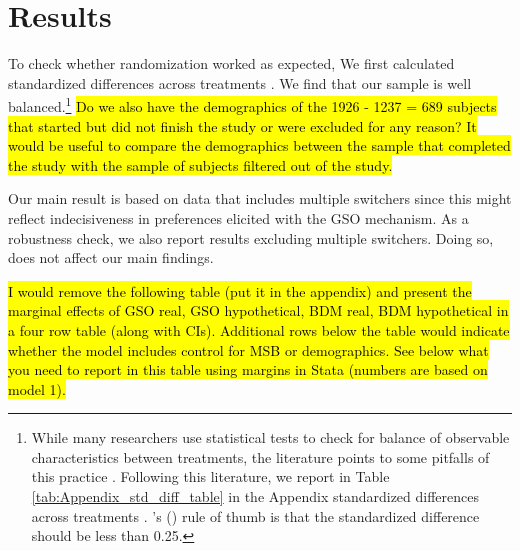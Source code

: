 \documentclass[12pt]{article}
\newcommand\citeapos[1]{\citeauthor{#1}'s (\citeyear{#1})} %
\begin{document}



\section{Results}
To check whether randomization worked as expected, We first calculated standardized differences across treatments \citep{CochranRubin1973}. We find that our sample is well balanced.\footnote{While many researchers use statistical tests to check for balance of observable characteristics between treatments, the literature points to some pitfalls of this practice \citep[e.g.,][]{canavari2019run,DeatonCartwright2016,BrizEtAl2017,HoEtAl2007,MoherEtAl2010,MutzPemantle2015}. Following this literature, we report in Table \ref{tab:Appendix_std_diff_table} in the Appendix standardized differences across treatments \citep{ImbensRubin2016,ImbensWooldridge2009}. \citeapos{CochranRubin1973} rule of thumb is that the standardized difference should be less than 0.25. }
\hl{Do we also have the demographics of the 1926 - 1237 = 689 subjects that started but did not finish the study or were excluded for any reason? It would be useful to compare the demographics between the sample that completed the study with the sample of subjects filtered out of the study. } %


Our main result is based on data that includes multiple switchers since this might reflect indecisiveness in preferences elicited with the GSO mechanism. As a robustness check, we also report results excluding multiple switchers. Doing so, does not affect our main findings.

\hl{I would remove the following table (put it in the appendix) and present the marginal effects of GSO real, GSO hypothetical, BDM real, BDM hypothetical in a four row table (along with CIs). Additional rows below the table would indicate whether the model includes control for MSB or demographics. See below what you need to report in this table using margins in Stata (numbers are based on model 1).}
\end{document}
